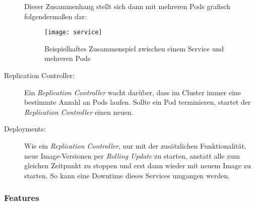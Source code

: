 \begin{description}
  Dieser Zusammenhang stellt sich dann mit mehreren Pods grafisch
  folgendermaßen dar:
  \begin{figure}[H]
  \centering
  \texttt{[image: service]}
  \caption{Beispielhaftes Zusammenspiel zwischen einem Service und mehreren Pods}
  \end{figure}
  \item[Replication Controller:]
  Ein \emph{Replication Controller} wacht darüber, dass im Cluster immer eine
  bestimmte Anzahl an Pods laufen. Sollte ein Pod terminieren, startet der
  \emph{Replication Controller} einen neuen.
  \item[Deployments:]
  Wie ein \emph{Replication Controller}, nur mit der  zusätzlichen
  Funktionalität, neue Image-Versionen per
  \emph{Rolling Update} zu starten, anstatt alle zum gleichen Zeitpunkt zu stoppen
  und erst dann wieder
  mit neuem Image zu starten. So kann eine Downtime dieses Services umgangen
  werden.

\end{description}

\subsubsection{Features}

